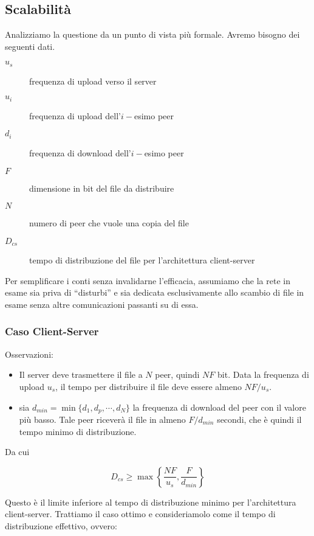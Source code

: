 \subsection{Scalabilità}\label{scalabilituxe0}

Analizziamo la questione da un punto di vista più formale. Avremo bisogno dei seguenti dati.

\begin{description}
\item[$u_s$]
frequenza di upload verso il server
\item[$u_i$]
frequenza di upload dell'$i-$esimo peer
\item[$d_i$]
frequenza di download dell'$i-$esimo peer
\item[$F$]
dimensione in bit del file da distribuire
\item[$N$]
numero di peer che vuole una copia del file
\item[$D_{cs}$]
tempo di distribuzione del file per l'architettura client-server
\end{description}

Per semplificare i conti senza invalidarne l'efficacia, assumiamo che la rete in esame sia priva di ``disturbi'' e sia dedicata esclusivamente allo scambio di file in esame senza altre comunicazioni passanti su di essa.

\subsubsection{Caso Client-Server}\label{caso-client-server}

Osservazioni:

\begin{itemize}
\item
  Il server deve trasmettere il file a $N$ peer, quindi $NF$ bit. Data   la frequenza di upload $u_s$, il tempo per distribuire il file deve   essere almeno $NF/u_s$.
\item
  sia $d_{min} = \min\{d_1,d_p,\cdots,d_N \}$ la frequenza di download   del peer con il valore più basso. Tale peer riceverà il file in almeno   $F/d_{min}$ secondi, che è quindi il tempo minimo di distribuzione.
\end{itemize}

Da cui

\[D_{cs} \geq \max \left\lbrace \frac{NF}{u_s}, \frac{F}{d_{min}} \right\rbrace\]

Questo è il limite inferiore al tempo di distribuzione minimo per l'architettura client-server. Trattiamo il caso ottimo e consideriamolo come il tempo di distribuzione effettivo, ovvero:

